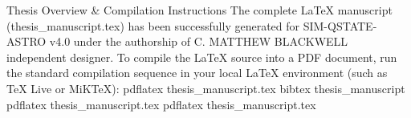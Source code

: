 Thesis Overview & Compilation Instructions
The complete LaTeX manuscript (thesis_manuscript.tex) has been successfully generated for SIM-QSTATE-ASTRO v4.0 under the authorship of C. MATTHEW BLACKWELL independent designer.
To compile the LaTeX source into a PDF document, run the standard compilation sequence in your local LaTeX environment (such as TeX Live or MiKTeX):
pdflatex thesis_manuscript.tex
bibtex thesis_manuscript
pdflatex thesis_manuscript.tex
pdflatex thesis_manuscript.tex

